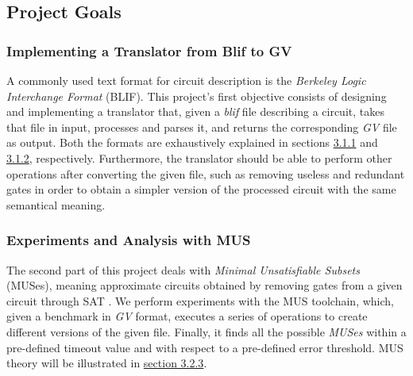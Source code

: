 \documentclass[]{usiinfbachelorproject}
\begin{document}
\subsection{Project Goals}\label{subsec:project-goals}
\subsubsection{Implementing a Translator from Blif to GV}\label{subsubsec:translator}
A commonly used text format for circuit description is the \textit{Berkeley Logic Interchange Format} (BLIF). This project's first objective consists of designing and implementing a translator that, given a \textit{blif} file describing a circuit, takes that file in input, processes and parses it, and returns the corresponding \textit{GV} file as output. Both the formats are exhaustively explained in sections \hyperref[subsubsec:blif-format]{3.1.1} and \hyperref[subsubsec:gv-format]{3.1.2}, respectively. Furthermore, the translator should be able to perform other operations after converting the given file, such as removing useless and redundant gates in order to obtain a simpler version of the processed circuit with the same semantical meaning.
\subsubsection{Experiments and Analysis with MUS}\label{subsubsec:experiments-and-analysis}
The second part of this project deals with \textit{Minimal Unsatisfiable Subsets} (MUSes), meaning approximate circuits obtained by removing gates from a given circuit through SAT \cite{sat}. We perform experiments with the MUS toolchain, which, given a benchmark in \textit{GV} format, executes a series of operations to create different versions of the given file. Finally, it finds all the possible \textit{MUSes} within a pre-defined timeout value and with respect to a pre-defined error threshold. MUS theory will be illustrated in \hyperref[subsubsec:mus]{section 3.2.3}.


\newpage

\end{document}
